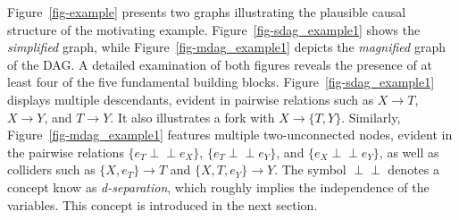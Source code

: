 \documentclass[
  authoryear,
  preprint,
  1p]{elsarticle}
\begin{document}
Figure~\ref{fig-example} presents two graphs illustrating the plausible
causal structure of the motivating example.
Figure~\ref{fig-sdag_example1} shows the \emph{simplified} graph, while
Figure~\ref{fig-mdag_example1} depicts the \emph{magnified} graph of the
DAG. A detailed examination of both figures reveals the presence of at
least four of the five fundamental building blocks.
Figure~\ref{fig-sdag_example1} displays multiple descendants, evident in
pairwise relations such as \(X \rightarrow T\), \(X \rightarrow Y\), and
\(T \rightarrow Y\). It also illustrates a fork with
\(X \rightarrow \{T,Y\}\). Similarly, Figure~\ref{fig-mdag_example1}
features multiple two-unconnected nodes, evident in the pairwise
relations \(\{e_{T} \perp\!\!\!\perp e_{X}\}\),
\(\{e_{T} \perp\!\!\!\perp e_{Y}\}\), and
\(\{e_{X} \perp\!\!\!\perp e_{Y}\}\), as well as colliders such as
\(\{X,e_{T}\} \rightarrow T\) and \(\{X,T,e_{Y}\} \rightarrow Y\). The
symbol \(\perp\!\!\!\perp\) denotes a concept know as
\emph{d-separation}, which roughly implies the independence of the
variables. This concept is introduced in the next section.
\end{document}
